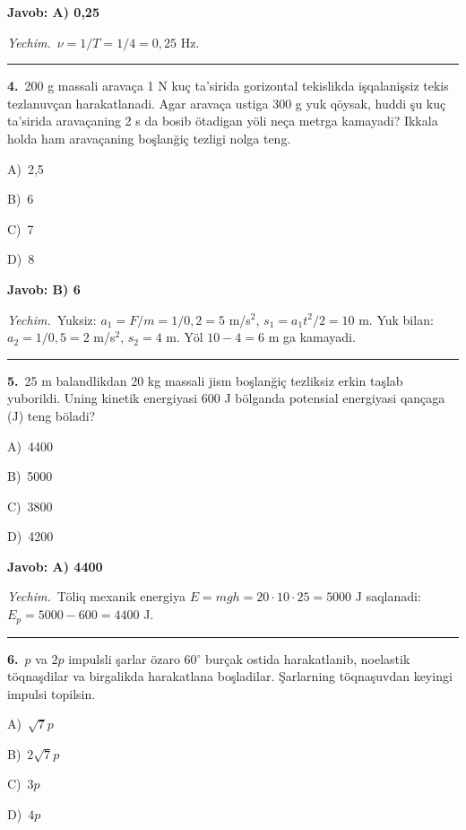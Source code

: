 \documentclass[11pt,a4paper]{article}
\newcommand{\opt}[2]{\hspace*{4mm}#1)\ #2\par}
\begin{document}
\noindent\colorbox{gray!12}{\parbox{\dimexpr\linewidth-2\fboxsep}{\textbf{Javob: A) 0,25}}}\par\smallskip
\noindent\textit{Yechim.}\ $\nu=1/T=1/4=0{,}25$ Hz.\par\par\medskip\hrule\medskip
{}\noindent\begin{minipage}{\linewidth}
\textbf{4.}\ 200 g massali aravaça 1 N kuç ta’sirida gorizontal tekislikda işqalanişsiz tekis tezlanuvçan harakatlanadi. Agar aravaça ustiga 300 g yuk qöysak, huddi şu kuç ta’sirida aravaçaning 2 s da bosib ötadigan yöli neça metrga kamayadi? Ikkala holda ham aravaçaning boşlanğiç tezligi nolga teng.\par\smallskip
\opt{A}{2,5}
\opt{B}{6}
\opt{C}{7}
\opt{D}{8}
\end{minipage}\vspace{2pt}\par
\noindent\colorbox{gray!12}{\parbox{\dimexpr\linewidth-2\fboxsep}{\textbf{Javob: B) 6}}}\par\smallskip
\noindent\textit{Yechim.}\ Yuksiz: $a_1=F/m=1/0{,}2=5$ m/s$^2$, $s_1=a_1t^2/2=10$ m. Yuk bilan: $a_2=1/0{,}5=2$ m/s$^2$, $s_2=4$ m. Yöl $10-4=6$ m ga kamayadi.\par\par\medskip\hrule\medskip
{}\noindent\begin{minipage}{\linewidth}
\textbf{5.}\ 25 m balandlikdan 20 kg massali jism boşlanğiç tezliksiz erkin taşlab yuborildi. Uning kinetik energiyasi 600 J bölganda potensial energiyasi qançaga (J) teng böladi?\par\smallskip
\opt{A}{4400}
\opt{B}{5000}
\opt{C}{3800}
\opt{D}{4200}
\end{minipage}\vspace{2pt}\par
\noindent\colorbox{gray!12}{\parbox{\dimexpr\linewidth-2\fboxsep}{\textbf{Javob: A) 4400}}}\par\smallskip
\noindent\textit{Yechim.}\ Töliq mexanik energiya $E=mgh=20\cdot10\cdot25=5000$ J saqlanadi: $E_p=5000-600=4400$ J.\par\par\medskip\hrule\medskip
{}\noindent\begin{minipage}{\linewidth}
\textbf{6.}\ $p$ va $2p$ impulsli şarlar özaro 60$^\circ$ burçak ostida harakatlanib, noelastik töqnaşdilar va birgalikda harakatlana boşladilar. Şarlarning töqnaşuvdan keyingi impulsi topilsin.\par\smallskip
\opt{A}{$\sqrt{7}p$}
\opt{B}{$2\sqrt{7}p$}
\opt{C}{$3p$}
\opt{D}{$4p$}
\end{minipage}\vspace{2pt}\par
\end{document}
